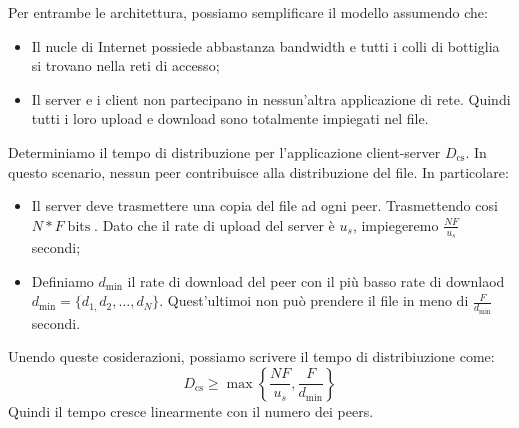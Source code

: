 \documentclass{book}
\newcommand{\tmop}[1]{\ensuremath{\operatorname{#1}}}
\begin{document}
Per entrambe le architettura, possiamo semplificare il modello assumendo che:
\begin{itemize}
  \item Il nucle di Internet possiede abbastanza bandwidth e tutti i colli di
  bottiglia si trovano nella reti di accesso;
  
  \item Il server e i client non partecipano in nessun'altra applicazione di
  rete. Quindi tutti i loro upload e download sono totalmente impiegati nel
  file.
\end{itemize}
Determiniamo il tempo di distribuzione per l'applicazione client-server
$D_{\tmop{cs}}$. In questo scenario, nessun peer contribuisce alla
distribuzione del file. In particolare:
\begin{itemize}
  \item Il server deve trasmettere una copia del file ad ogni peer.
  Trasmettendo cosi $N \ast F \tmop{bits}$. Dato che il rate di upload del
  server {\`e} $u_s$, impiegeremo $\frac{NF}{u_s}$ secondi;
  
  \item Definiamo $d_{\min}$ il rate di download del peer con il pi{\`u} basso
  rate di downlaod $d_{\min} = \{ d_{1,} d_2, \ldots, d_N \}$. Quest'ultimoi
  non pu{\`o} prendere il file in meno di $\frac{F}{d_{\min}}$ secondi.
\end{itemize}
Unendo queste cosiderazioni, possiamo scrivere il tempo di distribiuzione
come:
\[ D_{\tmop{cs}} \geqslant \max \left\{ \frac{NF}{u_s}, \frac{F}{d_{\min}}
   \right\} \]
Quindi il tempo cresce linearmente con il numero dei peers.
\end{document}
